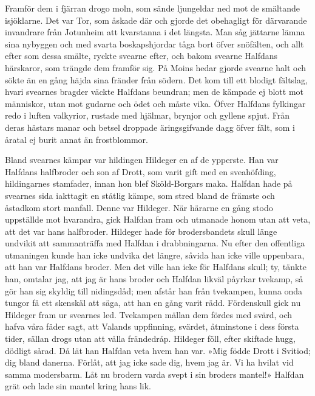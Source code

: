 Framför dem i fjärran drogo moln, som sände ljungeldar ned mot de
smältande isjöklarne. Det var Tor, som åskade där och gjorde det
obehagligt för därvarande invandrare från Jotunheim att kvarstanna i det
längsta. Man såg jättarne lämna sina nybyggen och med svarta
boskapshjordar tåga bort öfver snöfälten, och allt efter som dessa
smälte, ryckte svearne efter, och bakom svearne Halfdans härskaror, som
trängde dem framför sig. På Moins hedar gjorde svearne halt och sökte än
en gång häjda sina fränder från södern. Det kom till ett blodigt
fältslag, hvari svearnes bragder väckte Halfdans beundran; men de
kämpade ej blott mot människor, utan mot gudarne och ödet och måste
vika. Öfver Halfdans fylkingar redo i luften valkyrior, rustade med
hjälmar, brynjor och gyllene spjut. Från deras hästars manar och betsel
droppade äringsgifvande dagg öfver fält, som i åratal ej burit annat än
frostblommor.

Bland svearnes kämpar var hildingen Hildeger en af de ypperste. Han var
Halfdans halfbroder och son af Drott, som varit gift med en sveahöfding,
hildingarnes stamfader, innan hon blef Sköld-Borgars maka. Halfdan hade
på svearnes sida iakttagit en ståtlig kämpe, som stred bland de främste
och åstadkom stort manfall. Denne var Hildeger. När härarne en gång
stodo uppställde mot hvarandra, gick Halfdan fram och utmanade honom
utan att veta, att det var hans halfbroder. Hildeger hade för
brodersbandets skull länge undvikit att sammanträffa med Halfdan i
drabbningarna. Nu efter den offentliga utmaningen kunde han icke undvika
det längre, såvida han icke ville uppenbara, att han var Halfdans
broder. Men det ville han icke för Halfdans skull; ty, tänkte han,
omtalar jag, att jag är hans broder och Halfdan likväl påyrkar tvekamp,
så gör han sig skyldig till nidingsdåd; men afstår han från tvekampen,
kunna onda tungor få ett skenskäl att säga, att han en gång varit rädd.
Fördenskull gick nu Hildeger fram ur svearnes led. Tvekampen mällan dem
fördes med svärd, och hafva våra fäder sagt, att Valands uppfinning,
svärdet, åtminstone i dess första tider, sällan drogs
utan att vålla frändedråp. Hildeger föll, efter skiftade hugg, dödligt
sårad. Då lät han Halfdan veta hvem han var. »Mig födde Drott i Svitiod;
dig bland danerna. Förlåt, att jag icke sade dig, hvem jag är. Vi ha
hvilat vid samma modersbarm. Låt nu brodern varda svept i sin broders
mantel!» Halfdan grät och lade sin mantel kring hans lik.

